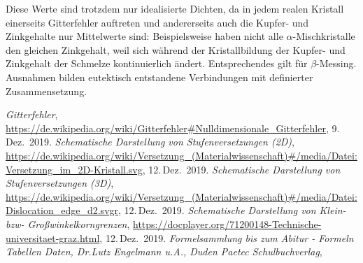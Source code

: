 \documentclass[german,  %
parskip=full,  %
]{scrartcl}
\begin{document}
Diese Werte sind trotzdem nur idealisierte Dichten, da in jedem realen Kristall einerseits
Gitterfehler auftreten und andererseits auch die Kupfer- und Zinkgehalte nur Mittelwerte sind: Beispielsweise haben nicht alle \(\alpha\)-Mischkristalle den gleichen Zinkgehalt, weil sich
während der Kristallbildung der Kupfer- und Zinkgehalt der Schmelze kontinuierlich ändert. Entsprechendes gilt für \(\beta\)-Messing. Ausnahmen bilden eutektisch entstandene
Verbindungen mit definierter Zusammensetzung.
    \begin{thebibliography}{9}
    \emph{Gitterfehler},
    \url{https://de.wikipedia.org/wiki/Gitterfehler#Nulldimensionale_Gitterfehler},
    9.\,Dez.~2019.
    \emph{Schematische Darstellung von Stufenversetzungen (2D)},
    \url{https://de.wikipedia.org/wiki/Versetzung_(Materialwissenschaft)#/media/Datei:Versetzung_im_2D-Kristall.svg},
    12.\,Dez.~2019.
    \emph{Schematische Darstellung von Stufenversetzungen (3D)},
    \url{https://de.wikipedia.org/wiki/Versetzung_(Materialwissenschaft)#/media/Datei:Dislocation_edge_d2.svgr},
    12.\,Dez.~2019.
    \emph{Schematische Darstellung von Klein- bzw- Großwinkelkorngrenzen},
    \url{https://docplayer.org/71200148-Technische-universitaet-graz.html},
    12.\,Dez.~2019.
    \emph{Formelsammlung bis zum Abitur - Formeln Tabellen Daten, Dr.Lutz Engelmann u.A.,
Duden Paetec Schulbuchverlag},
    \end{thebibliography}

\end{document}
